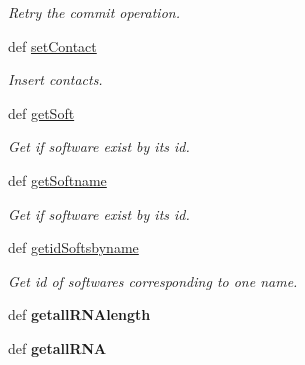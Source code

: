 \begin{DoxyCompactItemize}
\begin{DoxyCompactList}\small\item\em \-Retry the commit operation. \end{DoxyCompactList}\item 
def \hyperlink{classMycarn_1_1Sqlite__manager_1_1Sqlite__manager_a1b989b8f5e5d7962068170579bd902be}{set\-Contact}
\begin{DoxyCompactList}\small\item\em \-Insert contacts. \end{DoxyCompactList}\item 
def \hyperlink{classMycarn_1_1Sqlite__manager_1_1Sqlite__manager_a8f4a2f14efd6db97f563b7b453e15cf1}{get\-Soft}
\begin{DoxyCompactList}\small\item\em \-Get if software exist by its id. \end{DoxyCompactList}\item 
def \hyperlink{classMycarn_1_1Sqlite__manager_1_1Sqlite__manager_a25f4c0526ac3d61fba2d546ff7bc6adc}{get\-Softname}
\begin{DoxyCompactList}\small\item\em \-Get if software exist by its id. \end{DoxyCompactList}\item 
\hypertarget{classMycarn_1_1Sqlite__manager_1_1Sqlite__manager_a396fb9d28723c9dfa0bcd8ac2e1ac5d7}{
def \hyperlink{classMycarn_1_1Sqlite__manager_1_1Sqlite__manager_a396fb9d28723c9dfa0bcd8ac2e1ac5d7}{getid\-Softsbyname}}
\label{classMycarn_1_1Sqlite__manager_1_1Sqlite__manager_a396fb9d28723c9dfa0bcd8ac2e1ac5d7}

\begin{DoxyCompactList}\small\item\em \-Get id of softwares corresponding to one name. \end{DoxyCompactList}\item 
\hypertarget{classMycarn_1_1Sqlite__manager_1_1Sqlite__manager_a6d08de2428fdf921529766b4f3929ee5}{
def {\bfseries getall\-R\-N\-Alength}}
\label{classMycarn_1_1Sqlite__manager_1_1Sqlite__manager_a6d08de2428fdf921529766b4f3929ee5}

\item 
\hypertarget{classMycarn_1_1Sqlite__manager_1_1Sqlite__manager_a2c7155ec301c653b9d895041da60063d}{
def {\bfseries getall\-R\-N\-A}}
\label{classMycarn_1_1Sqlite__manager_1_1Sqlite__manager_a2c7155ec301c653b9d895041da60063d}


\end{DoxyCompactItemize}
